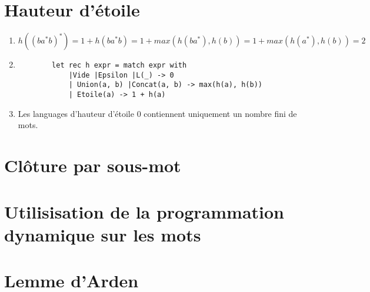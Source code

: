 \documentclass{article}
\begin{document}
\section{Hauteur d'\'etoile}

\begin{enumerate}
    \item $h((ba^*b)^*) = 1 + h(ba^*b) = 1 + max(h(ba^*), h(b)) = 1 + max(h(a^*), h(b)) = 2$
    \item \begin{verbatim}
        let rec h expr = match expr with
            |Vide |Epsilon |L(_) -> 0
            | Union(a, b) |Concat(a, b) -> max(h(a), h(b))
            | Etoile(a) -> 1 + h(a)
    \end{verbatim}
    \item Les languages d'hauteur d'\'etoile 0 contiennent uniquement un nombre fini de mots.
\end{enumerate}

\section{Cl\^oture par sous-mot}

\section{Utilisisation de la programmation dynamique sur les mots}

\section{Lemme d'Arden}
\end{document}
